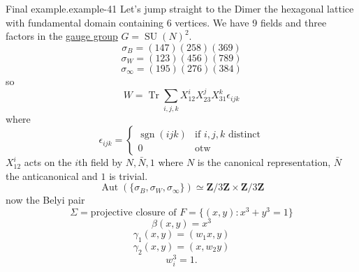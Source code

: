 \documentclass[10pt,]{book}
\numberwithin{equation}{section}
\newcommand{\ZZ}{\mathbf{Z}}
\DeclareMathOperator{\sgn}{sgn}
\DeclareMathOperator{\trace}{Tr}
\DeclareMathOperator{\Aut}{Aut}
\DeclareMathOperator{\specialunitary}{SU}
\newcommand{\amp}{&}
\begin{document}
\begin{example}{Final example.}{example-41}%
\hypertarget{p-781}{}%
Let's jump straight to the Dimer the hexagonal lattice with fundamental domain containing 6 vertices. We have 9 fields and three factors in the \hyperref[def-gauge-transformations]{gauge group} \(G = \specialunitary (N)^2\).%
\begin{equation*}
\sigma_B = (147)(258)(369)
\end{equation*}
%
\begin{equation*}
\sigma_W = (123)(456)(789)
\end{equation*}
%
\begin{equation*}
\sigma_\infty = (195)(276)(384)
\end{equation*}
so%
\begin{equation*}
W = \trace \sum_{i,j,k} X_{12}^iX_{23}^j X_{31}^k \epsilon_{ijk}
\end{equation*}
where%
\begin{equation*}
\epsilon_{ijk} = \begin{cases} \sgn(ijk) \amp\text{if }i,j,k \text{ distinct}\\ 0 \amp\text{otw}\end{cases}
\end{equation*}
\(X_{12}^i\) acts on the \(i\)th field by \(N, \bar N, 1\) where \(N\) is the canonical representation, \(\bar N\) the anticanonical and \(1\) is trivial.%
\begin{equation*}
\Aut(\{\sigma_B,\sigma_W, \sigma_\infty\})  \simeq \ZZ/3\ZZ\times \ZZ/3\ZZ
\end{equation*}
now the Belyi pair%
\begin{equation*}
\Sigma = \text{projective closure of } F = \{(x,y) : x^3+ y^3 =1\}
\end{equation*}
%
\begin{equation*}
\beta(x,y) = x^3
\end{equation*}
%
\begin{equation*}
\gamma_1(x,y) = (w_1 x, y)
\end{equation*}
%
\begin{equation*}
\gamma_2(x,y) = (x,w_2  y)
\end{equation*}
%
\begin{equation*}
w_i^3 = 1\text{.}
\end{equation*}
%
\end{example}
%
%
\typeout{************************************************}
\typeout{************************************************}
%
\end{document}
